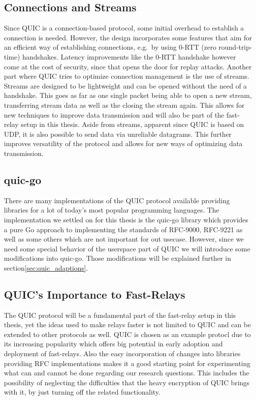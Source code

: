 \subsection{Connections and Streams}
Since QUIC is a connection-based protocol, some initial overhead to establish a connection is needed.
However, the design incorporates some features that aim for an efficient way of establishing 
connections, e.g.\ by using 0-RTT (zero round-trip-time) handshakes.
Latency improvements like the 0-RTT handshake however come at the cost of security, since that opens 
the door for replay attacks.
Another part where QUIC tries to optimize connection management is the use of streams.
Streams are designed to be lightweight and can be opened without the need of a handshake.
This goes as far as one single packet being able to open a new stream, transferring stream data
as well as the closing the stream again.
This allows for new techniques to improve data transmission and will also be part of the fast-relay 
setup in this thesis.
Aside from streams, apparent since QUIC is based on UDP, it is also possible to send data via
unreliable datagrams.
This further improves versatility of the protocol and allows for new ways of optimizing data transmission.

\subsection{quic-go}
There are many implementations of the QUIC protocol available providing libraries for a lot of 
today's most popular programming languages.
The implementation we settled on for this thesis is the quic-go library which provides a pure Go 
approach to implementing the standards of RFC-9000, RFC-9221 as well as some others which are not 
important for out usecase. 
However, since we need some special behavior of the userspace part of QUIC we will introduce some 
modifications into quic-go.  
Those modifications will be explained further in section\nobreakspace\ref{sec:quic_adaptions}.

\subsection{QUIC's Importance to Fast-Relays}
The QUIC protocol will be a fundamental part of the fast-relay setup in this thesis, yet the ideas used 
to make relays faster is not limited to QUIC and can be extended to other protocols as well.
QUIC is chosen as an example protocl due to its increasing popularity which offers big potential 
in early adoption and deployment of fast-relays.
Also the easy incorporation of changes into libraries providing RFC implementations makes it a good 
starting point for experimenting what can and cannot be done regarding our research questions.
This includes the possibility of neglecting the difficulties that the heavy encryption of QUIC brings with 
it, by just turning off the related functionality.


